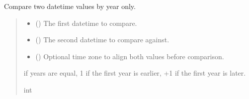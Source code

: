 \documentclass[letterpaper,10pt,english]{sphinxmanual}
\begin{document}
\begin{fulllineitems}

\begin{fulllineitems}
\label{\detokenize{apache_commons_validator_python.routines:apache_commons_validator_python.routines.date_validator.DateValidator.compare_years}}
\pysigstartsignatures
{}
\pysigstopsignatures
\sphinxAtStartPar
Compare two datetime values by year only.
\begin{quote}\begin{description}
\begin{itemize}
\item {} 
\sphinxAtStartPar
{} () \textendash{} The first datetime to compare.

\item {} 
\sphinxAtStartPar
{} () \textendash{} The second datetime to compare against.

\item {} 
\sphinxAtStartPar
{} (\sphinxstyleliteralemphasis{\sphinxupquote{{[}}}\sphinxstyleliteralemphasis{\sphinxupquote{{]}}}) \textendash{} Optional time zone to align both values before comparison.

\end{itemize}

 if years are equal,
\sphinxhyphen{}1 if the first year is earlier,
+1 if the first year is later.

\sphinxAtStartPar
int


\end{description}
\end{quote}
\end{fulllineitems}
\end{fulllineitems}
\end{document}
